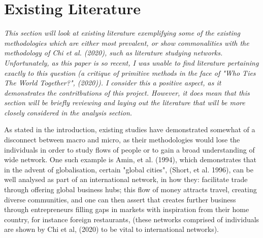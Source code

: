 \documentclass[12pt]{article}
\begin{document}
\section{Existing Literature}

\textit{
	This section will look at existing literature exemplifying some of the existing 
	methodologies which are either most prevalent, or show commonalities with the methodology 
	of Chi et al. (2020), such as literature studying networks. Unfortunately, as this paper is so recent, I was unable to find 
	literature pertaining exactly to this question (a critique of primitive methods in the 
	face of "Who Ties The World Together?", (2020)). I consider this a positive aspect, as 
	it demonstrates the contritbutions of this project. However, it does mean that this 
	section will be briefly reviewing and laying out the literature that will be more closely
	considered in the analysis section.
}
\newline

As stated in the introduction, existing studies have demonstrated somewhat of a disconnect 
between macro and micro, as their methodologies would lose the individuals in order to 
study flows of people or to gain a broad understanding of wide network. One such example 
is Amin, et al. (1994), which demonstrates that in the advent of globalisation, certain 
"global cities", (Short, et al. 1996), can be well analysed as part of an international 
network, in how they: facilitate trade through offering global business hubs; this flow 
of money attracts travel, creating diverse communities, and one can then assert that creates 
further business through entrepreneurs filling gaps in markets with inspiration from their 
home country, for instance foreign restaurants, (these networks comprised of individuals are shown by Chi et al, (2020) to 
be vital to international networks). 
\end{document}
